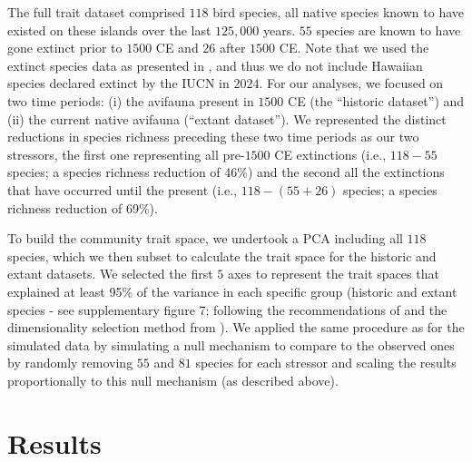 \documentclass[12pt,letterpaper]{article}
\begin{document}
The full trait dataset comprised $118$ bird species, all native species known to have existed on these islands over the last $125,000$ years.
$55$ species are known to have gone extinct prior to $1500$ CE and $26$ after $1500$ CE.
Note that we used the extinct species data as presented in \cite{matthews2023global}, and thus we do not include Hawaiian species declared extinct by the IUCN in $2024$.
For our analyses, we focused on two time periods: (i) the avifauna present in $1500$ CE (the ``historic dataset'') and (ii) the current native avifauna (``extant dataset'').
We represented the distinct reductions in species richness preceding these two time periods as our two stressors, the first one representing all pre-$1500$ CE extinctions (i.e., $118-55$ species; a species richness reduction of 46\%) and the second all the extinctions that have occurred until the present (i.e., $118-(55+26)$ species; a species richness reduction of 69\%).

To build the community trait space, we undertook a PCA including all $118$ species, which we then subset to calculate the trait space for the historic and extant datasets.
We selected the first $5$ axes to represent the trait spaces that explained at least 95\% of the variance in each specific group (historic and extant species - see supplementary figure 7; following the recommendations of \citealt{pigot2020macroevolutionary} and the dimensionality selection method from \citealt{guillerme2023innovation}).
We applied the same procedure as for the simulated data by simulating a null mechanism to compare to the observed ones by randomly removing $55$ and $81$ species for each stressor and scaling the results proportionally to this null mechanism (as described above).


\section{Results}
\end{document}

